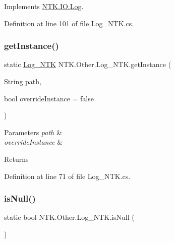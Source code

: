 Implements \mbox{\hyperlink{class_n_t_k_1_1_i_o_1_1_log_ac59e6a398332c79ad801e79f20ffed10}{N\+T\+K.\+I\+O.\+Log}}.



Definition at line 101 of file Log\+\_\+\+N\+T\+K.\+cs.

\mbox{\label{class_n_t_k_1_1_other_1_1_log___n_t_k_aad60827b3ba41438dc44d5f9016d418d}} 
\subsubsection{\texorpdfstring{getInstance()}{getInstance()}}
{\footnotesize\ttfamily static \mbox{\hyperlink{class_n_t_k_1_1_other_1_1_log___n_t_k}{Log\+\_\+\+N\+TK}} N\+T\+K.\+Other.\+Log\+\_\+\+N\+T\+K.\+get\+Instance (\begin{DoxyParamCaption}\item[{String}]{path,  }\item[{bool}]{override\+Instance = {\ttfamily false} }\end{DoxyParamCaption})\hspace{0.3cm}{\ttfamily [static]}}






\begin{DoxyParams}{Parameters}
{\em path} & \\
\hline
{\em override\+Instance} & \\
\hline
\end{DoxyParams}
\begin{DoxyReturn}{Returns}

\end{DoxyReturn}


Definition at line 71 of file Log\+\_\+\+N\+T\+K.\+cs.

\mbox{\label{class_n_t_k_1_1_other_1_1_log___n_t_k_afea2136df13554bf772aaa5d879d96a1}} 
\subsubsection{\texorpdfstring{isNull()}{isNull()}}
{\footnotesize\ttfamily static bool N\+T\+K.\+Other.\+Log\+\_\+\+N\+T\+K.\+is\+Null (\begin{DoxyParamCaption}{ }\end{DoxyParamCaption})\hspace{0.3cm}{\ttfamily [static]}}





